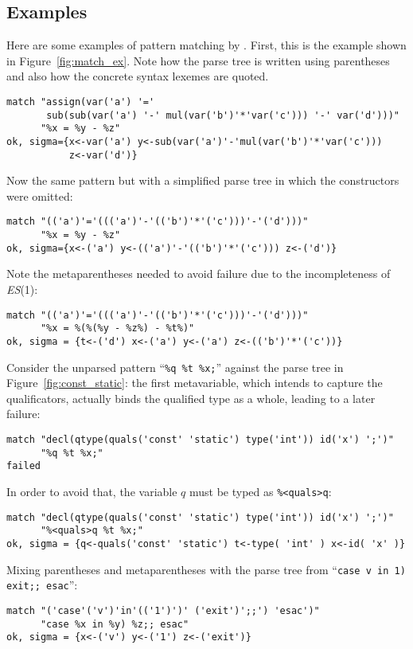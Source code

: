 \subsection{Examples}

Here are some examples of pattern matching by \Matchbox. First, this
is the example shown in Figure~\ref{fig:match_ex}. Note how the parse
tree is written using parentheses and also how the concrete syntax
lexemes are quoted.
{\small
\begin{verbatim}
match "assign(var('a') '='
       sub(sub(var('a') '-' mul(var('b')'*'var('c'))) '-' var('d')))"
      "%x = %y - %z"
ok, sigma={x<-var('a') y<-sub(var('a')'-'mul(var('b')'*'var('c')))
           z<-var('d')}
\end{verbatim}
}
\noindent Now the same pattern but with a simplified parse tree in
which the constructors were omitted:
{\small
\begin{verbatim}
match "(('a')'='((('a')'-'(('b')'*'('c')))'-'('d')))"
      "%x = %y - %z"
ok, sigma={x<-('a') y<-(('a')'-'(('b')'*'('c'))) z<-('d')}
\end{verbatim}
}
Note the meta\-parentheses needed to avoid failure due to the
incompleteness of \textit{ES}(1):
{\small
\begin{verbatim}
match "(('a')'='((('a')'-'(('b')'*'('c')))'-'('d')))"
      "%x = %(%(%y - %z%) - %t%)"
ok, sigma = {t<-('d') x<-('a') y<-('a') z<-(('b')'*'('c'))}
\end{verbatim}
}
Consider the unparsed pattern ``\texttt{\%q \%t \%x;}'' against the
parse tree in Figure~\ref{fig:const_static}: the first meta\-variable,
which intends to capture the qualificators, actually binds the
qualified type as a whole, leading to a later failure:
{\small
\begin{verbatim}
match "decl(qtype(quals('const' 'static') type('int')) id('x') ';')"
      "%q %t %x;"
failed
\end{verbatim}
}
In order to avoid that, the variable \(q\) must be typed as
\texttt{\%<quals>q}:
{\small
\begin{verbatim}
match "decl(qtype(quals('const' 'static') type('int')) id('x') ';')" 
      "%<quals>q %t %x;"
ok, sigma = {q<-quals('const' 'static') t<-type( 'int' ) x<-id( 'x' )}
\end{verbatim}
}
Mixing parentheses and meta\-parentheses with the parse
tree from ``\texttt{case v in 1) exit;; esac}'':
{\small
\begin{verbatim}
match "('case'('v')'in'(('1')')' ('exit')';;') 'esac')"
      "case %x in %y) %z;; esac"
ok, sigma = {x<-('v') y<-('1') z<-('exit')}
\end{verbatim}
}

